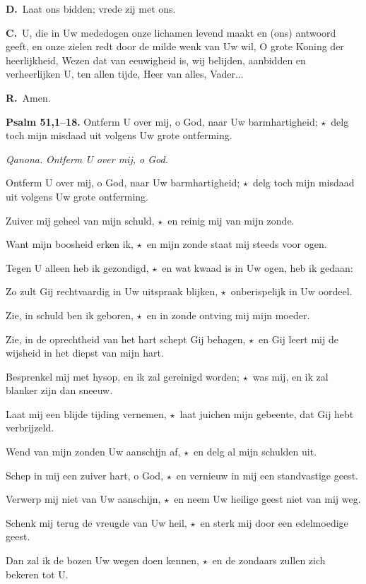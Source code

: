 \documentclass[12pt,twoside,a5paper]{article}
\newlength{\origparskip}
\newenvironment{halfparskip}{
  \setlength{\parskip}{0.5\origparskip}
}{
  \setlength{\parskip}{\origparskip}
}
\newcommand{\cc}{{\color{BrickRed} \textbf{C.}}}
\newcommand{\dd}{{\color{BrickRed} \textbf{D.}}}
\newcommand{\rr}{{\color{BrickRed} \textbf{R.}}}
\newcommand{\sep}{{\color{BrickRed} \textbf{$\star$}}}
\newcommand{\liturgicalhint}[1]{{\color{BrickRed}\footnotesize\itshape{#1}}}
\newcommand{\liturgicaloption}[1]{{\color{BrickRed}\textbf{#1}}}
\newcommand{\qanona}[1]{{\liturgicalhint{Qanona.}} \emph{#1}}
\newcommand{\psalm}[1]{\liturgicaloption{Psalm #1.}}
\begin{document}
\dd\ Laat ons bidden; vrede zij met ons.

\cc\ U, die in Uw mededogen onze lichamen levend maakt en (ons) antwoord geeft, en onze zielen redt door de milde wenk van Uw wil, O grote Koning der heerlijkheid, Wezen dat van eeuwigheid is, wij belijden, aanbidden en verheerlijken U, ten allen tijde, Heer van alles, Vader...

\rr\ Amen.

\begin{halfparskip}
  \psalm{51,1--18} Ontferm U over mij, o God, naar Uw barmhartigheid; \sep\ delg toch mijn misdaad uit volgens Uw grote ontferming.

  \qanona{Ontferm U over mij, o God.}

  Ontferm U over mij, o God, naar Uw barmhartigheid; \sep\ delg toch mijn misdaad uit volgens Uw grote ontferming.

  Zuiver mij geheel van mijn schuld, \sep\ en reinig mij van mijn zonde.

  Want mijn boosheid erken ik, \sep\ en mijn zonde staat mij steeds voor ogen.

  Tegen U alleen heb ik gezondigd, \sep\ en wat kwaad is in Uw ogen, heb ik gedaan:

  Zo zult Gij rechtvaardig in Uw uitspraak blijken, \sep\ onberispelijk in Uw oordeel.

  Zie, in schuld ben ik geboren, \sep\ en in zonde ontving mij mijn moeder.

  Zie, in de oprechtheid van het hart schept Gij behagen, \sep\ en Gij leert mij de wijsheid in het diepst van
  mijn hart.

  Besprenkel mij met hysop, en ik zal gereinigd worden; \sep\ was mij, en ik zal blanker zijn dan sneeuw.

  Laat mij een blijde tijding vernemen, \sep\ laat juichen mijn gebeente, dat Gij hebt verbrijzeld.

  Wend van mijn zonden Uw aanschijn af, \sep\ en delg al mijn schulden uit.

  Schep in mij een zuiver hart, o God, \sep\ en vernieuw in mij een standvastige geest.

  Verwerp mij niet van Uw aanschijn, \sep\ en neem Uw heilige geest niet van mij weg.

  Schenk mij terug de vreugde van Uw heil, \sep\ en sterk mij door een edelmoedige geest.

  Dan zal ik de bozen Uw wegen doen kennen, \sep\ en de zondaars zullen zich bekeren tot U.


\end{halfparskip}
\end{document}
